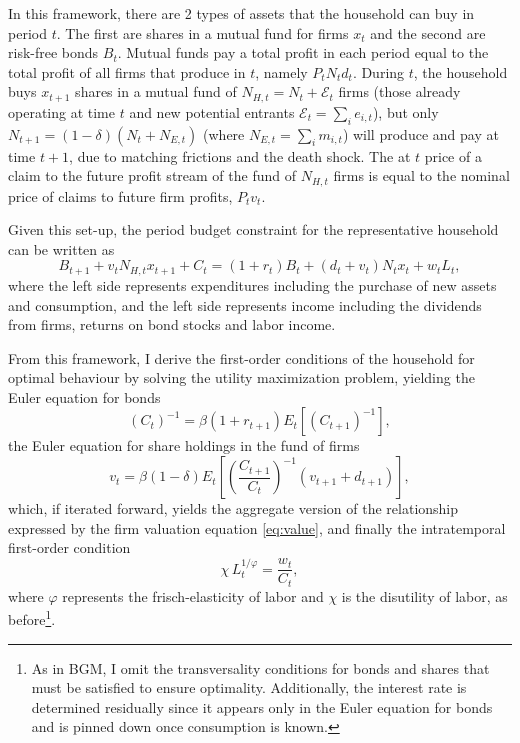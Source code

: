 \documentclass[a4paper,12pt]{article} %
\numberwithin{equation}{section} %
\numberwithin{figure}{section}
\numberwithin{table}{section}
\begin{document}
In this framework, there are 
2 types of assets that the household can buy in period $t$. The first are shares in a mutual fund for firms $x_t$ and the second are 
risk-free bonds $B_t$. Mutual funds pay a total profit in each period equal to the total profit of all firms that produce in $t$, namely $P_tN_td_t$. 
During $t$, the household buys $x_{t+1}$ shares in a mutual fund of $N_{H,t} = N_t + \mathcal{E}_{t}$ firms (those already operating at 
time $t$ and new potential entrants $\mathcal{E}_t = \sum_ie_{i,t}$), but only $N_{t+1} = (1-\delta)(N_t +N_{E,t})$ (where $N_{E,t} = 
\sum_im_{i,t}$) will produce and pay at time $t+1$, due to matching frictions and the death shock. The at $t$ price of a claim to the 
future profit stream of the fund of $N_{H,t}$ firms is equal to the nominal price of claims to future firm profits, $P_tv_t$.

Given this set-up, the period budget constraint for the representative household can be written as
$$B_{t+1} + v_t N_{H,t} x_{t+1} + C_t = (1 + r_t) B_t + (d_t + v_t) N_t x_t + w_t L_t,$$
where the left side represents expenditures including the purchase of new assets and consumption, and the left side represents income
including the dividends from firms, returns on bond stocks and labor income.

From this framework, I derive the first-order conditions of the household for optimal behaviour by solving the utility maximization problem,
yielding the Euler equation for bonds 
\begin{equation}
(C_t)^{-1} = \beta (1 + r_{t+1}) E_t \left[ (C_{t+1})^{-1} \right], \label{eq:eulerbonds}
\end{equation}
the Euler equation for share holdings in the fund of firms 
\begin{equation}
v_t = \beta (1 - \delta) E_t \left[ \left( \frac{C_{t+1}}{C_t} \right)^{-1} (v_{t+1} + d_{t+1}) \right], \label{eq:Eulershares}
\end{equation}
which, if iterated forward, yields the aggregate version of the relationship expressed by the firm valuation equation \eqref{eq:value}, and finally the intratemporal 
first-order condition 
\begin{equation}
\chi\,L_{t}^{1/\varphi}=\frac{w_t}{C_t}, \label{eq:intratemp}
\end{equation}
where $\varphi$ represents the frisch-elasticity of labor and $\chi$ is the
disutility of labor, as before\footnote{As in BGM, I omit the transversality conditions for bonds and shares that must be satisfied to
ensure optimality. Additionally, the interest rate is determined residually since it appears only in the Euler equation for bonds and is pinned
down once consumption is known.}.
\end{document}
